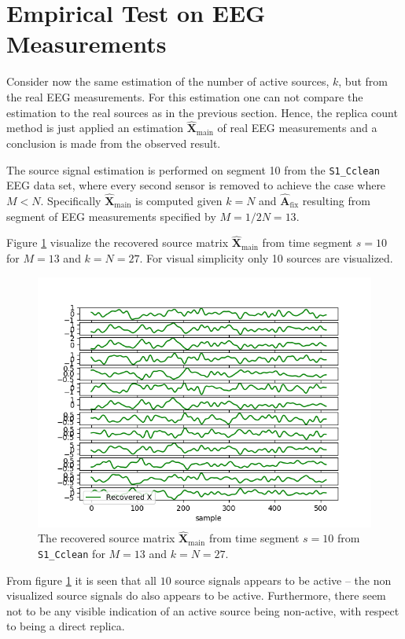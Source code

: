 \section{Empirical Test on EEG Measurements}
Consider now the same estimation of the number of active sources, $k$, but from the real EEG measurements. 
For this estimation one can not compare the estimation to the real sources as in the previous section.
Hence, the replica count method is just applied an estimation $\hat{\mathbf{X}}_{\text{main}}$ of real EEG measurements and a conclusion is made from the observed result.

The source signal estimation is performed on segment 10 from the \texttt{S1\_Cclean} EEG data set, where every second sensor is removed to achieve the case where $M < N$. 
Specifically $\hat{\mathbf{X}}_{\text{main}}$ is computed given $k = N$ and $\hat{\textbf{A}}_{\text{fix}}$ resulting from segment of EEG measurements specified by $M = 1/2 N = 13$. 

Figure \ref{fig:eeg_k} visualize the recovered source matrix $\hat{\mathbf{X}}_{\text{main}}$ from time segment $s = 10$ for $M = 13$ and $k = N = 27$. For visual simplicity only  10 sources are visualized.
\begin{figure}[H]
    \centering
	\includegraphics[scale=0.5]{figures/ch_estimate/eeg_k_timeseg_10.png}
	\caption{The recovered source matrix $\hat{\mathbf{X}}_{\text{main}}$ from time segment $s = 10$ from \texttt{S1\_Cclean} for $M = 13$ and $k = N = 27$.}
	\label{fig:eeg_k}
\end{figure}
\noindent
From figure \ref{fig:eeg_k} it is seen that all $10$ source signals appears to be active -- the non visualized source signals do also appears to be active.
Furthermore, there seem not to be any visible indication of an active source being non-active, with respect to being a direct replica. 


